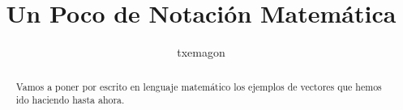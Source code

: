 \documentclass[a4paper,10pt,spanish]{article}
\title{Un Poco de Notación Matemática}
\author{txemagon}
\begin{document}
\maketitle

\begin{abstract}
Vamos a poner por escrito en lenguaje matemático los ejemplos  de vectores que hemos ido haciendo hasta ahora.
\end{abstract}


\end{document}
